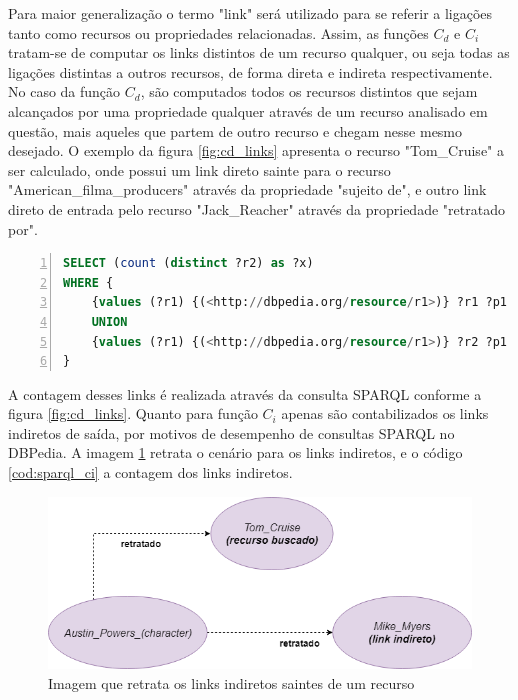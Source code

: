 Para maior generalização o termo "link" será utilizado para se referir a ligações tanto como recursos ou propriedades relacionadas. Assim, as funções $C_d$ e $C_i$ tratam-se de computar os links distintos de um recurso qualquer, ou seja todas as ligações distintas a outros recursos, de forma direta e indireta respectivamente. No caso da função $C_d$, são computados todos os recursos distintos que sejam alcançados por uma propriedade qualquer através de um recurso analisado em questão, mais aqueles que partem de outro recurso e chegam nesse mesmo desejado. O exemplo da figura \ref{fig:cd_links} apresenta o recurso "Tom\_Cruise" a ser calculado, onde possui um link direto sainte para o recurso "American\_filma\_producers" através da propriedade "sujeito de", e outro link direto de entrada pelo recurso "Jack\_Reacher" através da propriedade "retratado por". 


\begin{lstlisting}[caption=Consulta SPARQL para contagem de links diretos, language=SQL, frame=single, label={cod:sparql_cd}, float, numbers=left]
SELECT (count (distinct ?r2) as ?x)
WHERE {
	{values (?r1) {(<http://dbpedia.org/resource/r1>)} ?r1 ?p1 ?r2 . FILTER (?r1 != ?r2) . FILTER (!isLiteral(?r2) )}
	UNION
	{values (?r1) {(<http://dbpedia.org/resource/r1>)} ?r2 ?p1 ?r1 . FILTER (?r1 != ?r2) . FILTER (!isLiteral(?r2) )}
}
\end{lstlisting}

A contagem desses links é realizada através da consulta \ac{SPARQL} conforme a figura \ref{fig:cd_links}. Quanto para função $C_i$ apenas são contabilizados os links indiretos de saída, por motivos de desempenho de consultas SPARQL no DBPedia. A imagem \ref{fig:ci_links} retrata o cenário para os links indiretos, e o código \ref{cod:sparql_ci} a contagem dos links indiretos.

\begin{figure}
	\centering
	\includegraphics[scale=0.5]{imagens/ci_links.png}
	\caption{Imagem que retrata os links indiretos saintes de um recurso}
	\label{fig:ci_links}
\end{figure}

